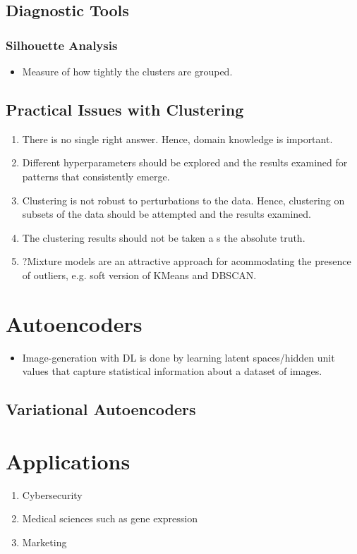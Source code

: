 \documentclass[a4paper, 12pt]{report}
\begin{document}

\section{Diagnostic Tools}
\subsection{Silhouette Analysis}
\label{subsec:silanalysis}
\begin{itemize}
\item Measure of how tightly the clusters are grouped.
\end{itemize}

\section{Practical Issues with Clustering}
\begin{enumerate}
\item There is no single right answer. Hence, domain knowledge is important.
\item Different hyperparameters should be explored and the results examined for patterns that consistently emerge.
\item Clustering is not robust to perturbations to the data. Hence, clustering on subsets of the data should be attempted and the results examined.
\item The clustering results should not be taken a s the absolute truth.
\item {\color{red}?}Mixture models are an attractive approach for acommodating the presence of outliers, e.g. soft version of KMeans and DBSCAN.
\end{enumerate}

\chapter{Autoencoders}
\begin{itemize}
\item Image-generation with DL is done by learning latent spaces/hidden unit values that capture statistical information about a dataset of images.
\end{itemize}

\section{Variational Autoencoders}

\chapter{Applications}
\begin{enumerate}
\item Cybersecurity
\item Medical sciences such as gene expression
\item Marketing
\end{enumerate}
\end{document}
